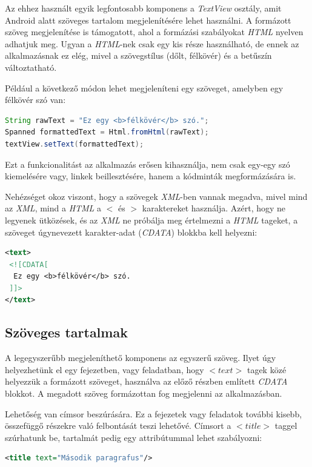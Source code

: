 \documentclass[12pt,a4paper]{article}
\newcommand{\xml}{\textit{XML}\xspace}
\begin{document}
	Az ehhez használt egyik legfontosabb komponens a \textit{TextView} osztály, amit Android alatt szöveges tartalom megjelenítésére lehet használni. A formázott szöveg megjelenítése is támogatott, ahol a formázási szabályokat \textit{HTML} nyelven adhatjuk meg. Ugyan a \textit{HTML}-nek csak egy kis része használható, de ennek az alkalmazásnak ez elég, mivel a szövegstílus (dőlt, félkövér) és a betűszín változtatható.
	
	Például a következő módon lehet megjeleníteni egy szöveget, amelyben egy félkövér szó van:
	
	\bigskip
	\begin{lstlisting}[language=Java]
String rawText = "Ez egy <b>félkövér</b> szó.";
Spanned formattedText = Html.fromHtml(rawText);
textView.setText(formattedText);
	\end{lstlisting}
	\bigskip
	
	Ezt a funkcionalitást az alkalmazás erősen kihasználja, nem csak egy-egy szó kiemelésére vagy, linkek beillesztésére, hanem a kódminták megformázására is.
	
	Nehézséget okoz viszont, hogy a szövegek \textit{XML}-ben vannak megadva, mivel mind az \xml, mind a \textit{HTML} a $<$ és $>$ karaktereket használja. Azért, hogy ne legyenek ütközések, és az \xml ne próbálja meg értelmezni a \textit{HTML} tageket, a szöveget úgynevezett karakter-adat (\textit{CDATA}) blokkba kell helyezni:
	
	\bigskip
	\begin{lstlisting}[language=XML]
<text>
 <![CDATA[
  Ez egy <b>félkövér</b> szó.
 ]]>
</text>
	\end{lstlisting}
	
	\subsection{Szöveges tartalmak}
	
	A legegyszerűbb megjeleníthető komponens az egyszerű szöveg. Ilyet úgy helyezhetünk el egy fejezetben, vagy feladatban, hogy $<text>$ tagek közé helyezzük a formázott szöveget, használva az előző részben említett \textit{CDATA} blokkot. A megadott szöveg formázottan fog megjelenni az alkalmazásban.
	
	Lehetőség van címsor beszúrására. Ez a fejezetek vagy feladatok további kisebb, összefüggő részekre való felbontását teszi lehetővé. Címsort a $<title>$ taggel szúrhatunk be, tartalmát pedig egy attribútummal lehet szabályozni:
	
	\bigskip
	\begin{lstlisting}[language=XML]
	<title text="Második paragrafus"/>
	\end{lstlisting}
	\bigskip
	
\end{document}
